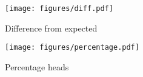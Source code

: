 \documentclass[letterpaper]{article}
\begin{document}
  \begin{figure}[H]
    \centering
    \texttt{[image: figures/diff.pdf]}
    \caption{Difference from expected}\label{fig:diff}
  \end{figure}

  \begin{figure}[H]
    \centering
    \texttt{[image: figures/percentage.pdf]}
    \caption{Percentage heads}\label{fig:percentage}
  \end{figure}
\end{document}
